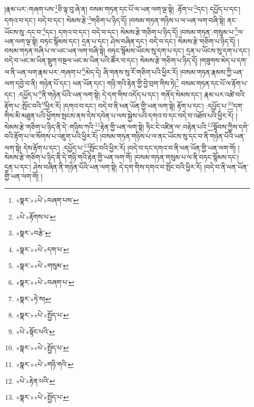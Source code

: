 །རྣམ་པར་:གཞག་པས་\footnote{«སྣར་»«པེ་»བཞག་པས་}ཅི་ལྟ་བུ་ཞེ་ན། བསམ་གཏན་དང་པོ་ལ་ཡན་ལག་ལྔ་སྟེ། :རྟོག་པ་\footnote{«པེ་»རྟོགས་པ་}དང་། དཔྱོད་པ་དང་། དགའ་བ་དང་། བདེ་བ་དང་། སེམས་རྩེ་\footnote{«སྣར་»བརྩེ་}གཅིག་པ་ཉིད་དོ། །བསམ་གཏན་གཉིས་པ་ལ་ཡན་ལག་བཞི་སྟེ། ནང་ཡོངས་སུ་:དང་བ་\footnote{«སྣར་»«པེ་»དག་པ་}དང་། དགའ་བ་དང་། བདེ་བ་དང་། སེམས་རྩེ་གཅིག་པ་ཉིད་དོ། །བསམ་གཏན་:གསུམ་པ་\footnote{«སྣར་»«པེ་»གསུམ་}ལ་ཡན་ལག་ལྔ་སྟེ། བཏང་སྙོམས་དང་། དྲན་པ་དང་། ཤེས་བཞིན་དང་། བདེ་བ་དང་། སེམས་རྩེ་གཅིག་པ་ཉིད་དོ། །བསམ་གཏན་བཞི་པ་ལ་ཡང་ཡན་ལག་བཞི་སྟེ། བཏང་སྙོམས་ཡོངས་སུ་དག་པ་དང་། དྲན་པ་ཡོངས་སུ་དག་པ་དང་། བདེ་བ་ཡང་མ་ཡིན་སྡུག་བསྔལ་ཡང་མ་ཡིན་པའི་ཚོར་བ་དང་། སེམས་རྩེ་གཅིག་པ་ཉིད་དོ། །གཟུགས་མེད་པ་དག་ལ་ནི་ཡན་ལག་རྣམ་པར་:གཞག་པ་\footnote{«སྣར་»«པེ་»བཞག་པ་}མེད་དེ། ཞི་གནས་སུ་རོ་གཅིག་པའི་ཕྱིར་རོ། །བསམ་གཏན་རྣམས་ཀྱི་ཡན་ལག་དབྱེ་བ་ནི། གཉེན་པོ་དང་། ཕན་ཡོན་དང་། གཉི་གའི་རྟེན་གྱི་བྱེ་བྲག་གིས་ཏེ།\footnote{«སྣར་»ཏེ་ས།} བསམ་གཏན་དང་པོ་ལ་རྟོག་པ་དང་། :དཔྱོད་པ་\footnote{«སྣར་»«པེ་»སྤྱོད་པ་}ནི་གཉེན་པོའི་ཡན་ལག་སྟེ། དེ་དག་གིས་འདོད་པ་དང་། གནོད་སེམས་དང་། རྣམ་པར་འཚེ་བའི་རྟོག་པ་:སྤོང་བའི་\footnote{«པེ་»སྟོང་པའི་}ཕྱིར་རོ། །དགའ་བ་དང་། བདེ་བ་ནི་ཕན་ཡོན་གྱི་ཡན་ལག་སྟེ། རྟོག་པ་དང་། :དཔྱོད་པ་\footnote{«སྣར་»«པེ་»སྤྱོད་པ་}དག་གིས་མི་མཐུན་པའི་ཕྱོགས་སྤངས་ནས་དེས་དབེན་པ་ལས་སྐྱེས་པའི་དགའ་བ་དང་བདེ་བ་འཐོབ་པའི་ཕྱིར་རོ། །སེམས་རྩེ་གཅིག་པ་ཉིད་ནི་དེ་:གཉིས་ཀའི་\footnote{«སྣར་»«པེ་»གཉི་གའི་}རྟེན་གྱི་ཡན་ལག་སྟེ། ཏིང་ངེ་འཛིན་ལ་:བརྟེན་པའི་\footnote{«པེ་»རྟེན་པའི་}སྟོབས་ཀྱིས་དགེ་བའི་རྟོག་པ་ལ་སོགས་པ་འཇུག་པའི་ཕྱིར་རོ། །བསམ་གཏན་གཉིས་པ་ལ་ནང་ཡོངས་སུ་དང་བ་ནི་གཉེན་པོའི་ཡན་ལག་སྟེ། དེས་རྟོག་པ་དང་། :དཔྱོད་པ་\footnote{«སྣར་»«པེ་»སྤྱོད་པ་}སྤོང་བའི་ཕྱིར་རོ། །བདེ་བ་དང་དགའ་བ་ནི་ཕན་ཡོན་གྱི་ཡན་ལག་གོ། །སེམས་རྩེ་གཅིག་པ་ཉིད་ནི་དེ་གཉི་གའི་རྟེན་གྱི་ཡན་ལག་གོ། །བསམ་གཏན་གསུམ་པ་ལ་ནི་བཏང་སྙོམས་དང་། དྲན་པ་དང་། ཤེས་བཞིན་ནི་གཉེན་པོའི་ཡན་ལག་སྟེ། དེ་དག་གིས་དགའ་བ་སྤོང་བའི་ཕྱིར་རོ། །བདེ་བ་ནི་ཕན་ཡོན་གྱི་ཡན་ལག་གོ། །
